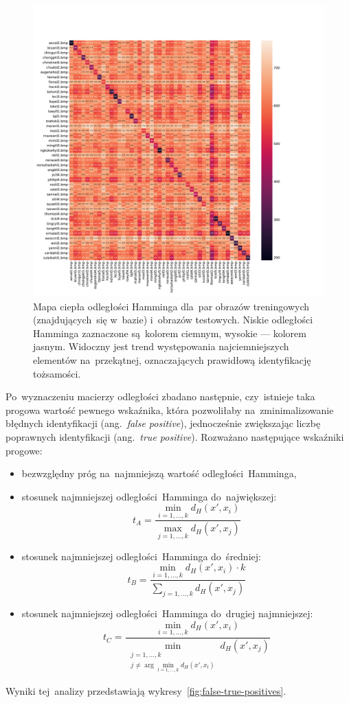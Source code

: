 \documentclass[11pt,a4paper]{article}
\begin{document}
\begin{figure}
    \centering
    \includegraphics[width=\textwidth]{res/img/heatmap.pdf}
    \caption{
        Mapa ciepła odległości Hamminga dla~par obrazów treningowych (znajdujących~się w~bazie) i~obrazów testowych.
        Niskie odległości Hamminga zaznaczone są~kolorem ciemnym, wysokie --- kolorem jasnym.
        Widoczny jest trend występowania najciemniejszych elementów na~przekątnej, oznaczających prawidłową identyfikację tożsamości.
    }
    \label{fig:heatmap}
\end{figure}

Po~wyznaczeniu macierzy odległości zbadano następnie, czy~istnieje taka progowa wartość pewnego wskaźnika, która pozwoliłaby na~zminimalizowanie błędnych identyfikacji (ang.~\emph{false positive}), jednocześnie zwiększając liczbę poprawnych identyfikacji (ang.~\emph{true positive}).
Rozważano następujące wskaźniki progowe:
\begin{itemize}
    \item bezwzględny próg na~najmniejszą wartość odległości~Hamminga,
    \item stosunek najmniejszej odległości~Hamminga do~największej:
    $$ t_A = \frac{\min_{i=1, \dots, k} d_H(x', x_i)}{\max_{j=1, \dots, k} d_H(x', x_j)}$$
    \item stosunek najmniejszej odległości~Hamminga do~średniej:
    $$ t_B = \frac{\min_{i=1, \dots, k} d_H(x', x_i) \cdot k}{\sum_{j=1, \dots, k} d_H(x', x_j)} $$
    \item stosunek najmniejszej odległości~Hamminga do~drugiej najmniejszej:
    $$ t_C = \frac{\min_{i=1, \dots, k} d_H(x', x_i)}{\min_{\substack{j=1, \dots, k \\ j \neq \arg \min_{l=1, \dots, k} d_H(x', x_l)}} d_H(x', x_j)}$$
\end{itemize}
Wyniki tej~analizy przedstawiają wykresy~\ref{fig:false-true-positives}.
\end{document}
